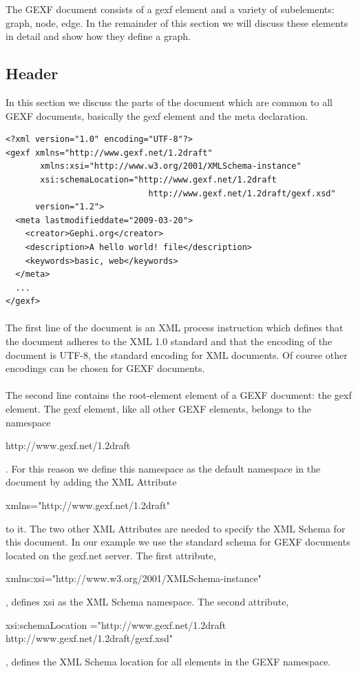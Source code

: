 \documentclass[a4paper,10pt]{article}
\begin{document}
The GEXF document consists of a gexf element and a variety of subelements: graph, node, edge. In the remainder of this section we will discuss these elements in detail and show how they define a graph.

\subsection{Header}

In this section we discuss the parts of the document which are common to all GEXF documents, basically the gexf element and the meta declaration.

\lstset{ style=gexf }
\begin{lstlisting}[caption={Header},label=header]
<?xml version="1.0" encoding="UTF-8"?>
<gexf xmlns="http://www.gexf.net/1.2draft"
       xmlns:xsi="http://www.w3.org/2001/XMLSchema-instance"
       xsi:schemaLocation="http://www.gexf.net/1.2draft
                             http://www.gexf.net/1.2draft/gexf.xsd"
      version="1.2">
  <meta lastmodifieddate="2009-03-20">
    <creator>Gephi.org</creator>
    <description>A hello world! file</description>
    <keywords>basic, web</keywords>
  </meta>
  ...
</gexf>
\end{lstlisting}

\paragraph{}
The first line of the document is an XML process instruction which defines that the document adheres to the XML 1.0 standard and that the encoding of the document is UTF-8, the standard encoding for XML documents. Of course other encodings can be chosen for GEXF documents.

\paragraph{}
The second line contains the root-element element of a GEXF document: the gexf element. The gexf element, like all other GEXF elements, belongs to the namespace \begin{footnotesize}http://www.gexf.net/1.2draft\end{footnotesize}. For this reason we define this namespace as the default namespace in the document by adding the XML Attribute \begin{footnotesize}xmlns="http://www.gexf.net/1.2draft"\end{footnotesize} to it. The two other XML Attributes are needed to specify the XML Schema for this document. In our example we use the standard schema for GEXF documents located on the gexf.net server. The first attribute, \begin{footnotesize}xmlns:xsi="http://www.w3.org/2001/XMLSchema-instance"\end{footnotesize}, defines xsi as the XML Schema namespace. The second attribute, \begin{footnotesize}xsi:schemaLocation ="http://www.gexf.net/1.2draft http://www.gexf.net/1.2draft/gexf.xsd"\end{footnotesize}, defines the XML Schema location for all elements in the GEXF namespace.
\end{document}
